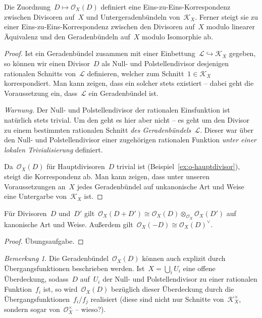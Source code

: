 \documentclass[a4paper,ngerman,12pt]{scrartcl}
\theoremstyle{definition}
\theoremstyle{plain}
\theoremstyle{remark}
\newtheorem{rem}[defn]{Bemerkung}
\newcommand{\K}{\mathcal{K}}
\renewcommand{\L}{\mathcal{L}}
\renewcommand{\O}{\mathcal{O}}
\begin{document}
\begin{prop}\label{prop:div-pic}Die Zuordnung~$D \mapsto \O_X(D)$ definiert eine
Eins-zu-Eins-Korres\-pon\-denz zwischen Divisoren auf~$X$ und Untergeradenbündeln
von~$\K_X$. Ferner steigt sie zu einer Eins-zu-Eins-Korrespondenz zwischen
den Divisoren auf~$X$ modulo linearer Äquivalenz und den Geradenbündeln
auf~$X$ modulo Isomorphie ab.
\end{prop}
\begin{proof}Ist ein Geradenbündel zusammen mit einer Einbettung~$\L
\hookrightarrow \K_X$ gegeben, so können wir einen Divisor~$D$ als Null- und
Polstellendivisor desjenigen rationalen Schnitts von~$\L$ definieren, welcher
zum Schnitt~$1 \in \K_X$ korrespondiert. Man kann zeigen, dass ein
solcher stets existiert -- dabei geht die Voraussetzung ein, dass~$\L$ ein
Geradenbündel ist.

\emph{Warnung.} Der Null- und Polstellendivisor der rationalen Einsfunktion ist
natürlich stets trivial. Um den geht es hier aber nicht -- es geht um den
Divisor zu einem bestimmten rationalen Schnitt \emph{des Geradenbündels~$\L$}. Dieser war
über den Null- und Polstellendivisor einer zugehörigen rationalen Funktion
\emph{unter einer lokalen Trivialisierung} definiert.

Da~$\O_X(D)$ für Hauptdivisoren~$D$ trivial ist
(Beispiel~\ref{ex:o-hauptdivisor}), steigt die Korrespondenz ab. Man kann
zeigen, dass unter unseren Voraussetzungen an~$X$ jedes Geradenbündel auf
unkanonische Art und Weise eine Untergarbe von~$\K_X$ ist.
\end{proof}

\begin{lemma}Für Divisoren~$D$ und~$D'$ gilt~$\O_X(D + D') \cong \O_X(D)
\otimes_{\O_X} \O_X(D')$ auf kanonische Art und Weise. Außerdem gilt~$\O_X(-D)
\cong \O_X(D)^\vee$.\end{lemma}
\begin{proof}Übungsaufgabe.
\end{proof}

\begin{rem}Die Geradenbündel~$\O_X(D)$ können auch explizit durch
Übergangs\-funk\-tio\-nen beschrieben werden. Ist~$X = \bigcup_i U_i$ eine offene
Überdeckung, sodass~$D$ auf~$U_i$ der Null- und Polstellendivisor zu einer
rationalen Funktion~$f_i$ ist, so wird~$\O_X(D)$ bezüglich dieser Überdeckung
durch die Übergangsfunktionen~$f_i/f_j$ realisiert (diese sind nicht nur
Schnitte von~$\K_X^\times$, sondern sogar von~$\O_X^\times$ -- wieso?).
\end{rem}
\end{document}
